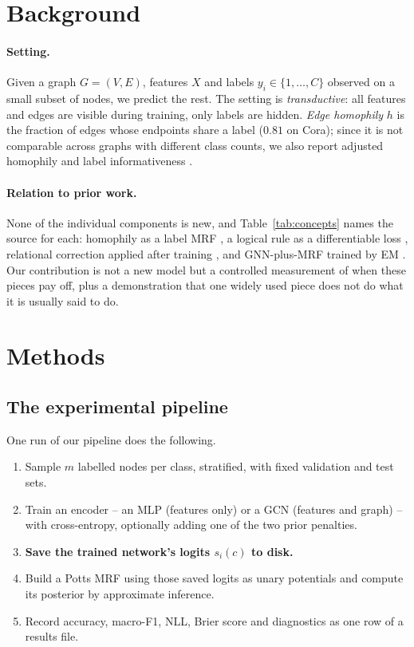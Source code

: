 \documentclass{article}
\begin{document}
\section{Background}

\paragraph{Setting.} Given a graph $G=(V,E)$, features $X$ and labels $y_i\in\{1,\dots,C\}$
observed on a small subset of nodes, we predict the rest. The setting is \emph{transductive}:
all features and edges are visible during training, only labels are hidden. \emph{Edge
homophily} $h$ is the fraction of edges whose endpoints share a label ($0.81$ on Cora); since it
is not comparable across graphs with different class counts, we also report adjusted homophily
and label informativeness \citep{platonov2023characterizing}.

\paragraph{Relation to prior work.} None of the individual components is new, and
Table~\ref{tab:concepts} names the source for each: homophily as a label MRF
\citep{zhu2003semi}, a logical rule as a differentiable loss \citep{hu2016harnessing,
xu2018semantic}, relational correction applied after training \citep{gasteiger2019predict,
huang2021combining}, and GNN-plus-MRF trained by EM \citep{qu2019gmnn}. Our contribution is not a
new model but a controlled measurement of when these pieces pay off, plus a demonstration that
one widely used piece does not do what it is usually said to do.

\section{Methods}

\subsection{The experimental pipeline}

One run of our pipeline does the following.

\begin{enumerate}\itemsep1pt
\item Sample $m$ labelled nodes per class, stratified, with fixed validation and test sets.
\item Train an encoder -- an MLP (features only) or a GCN (features and graph) -- with
      cross-entropy, optionally adding one of the two prior penalties.
\item \textbf{Save the trained network's logits $s_i(c)$ to disk.}
\item Build a Potts MRF using those saved logits as unary potentials and compute its posterior
      by approximate inference.
\item Record accuracy, macro-F1, NLL, Brier score and diagnostics as one row of a results file.
\end{enumerate}
\end{document}

